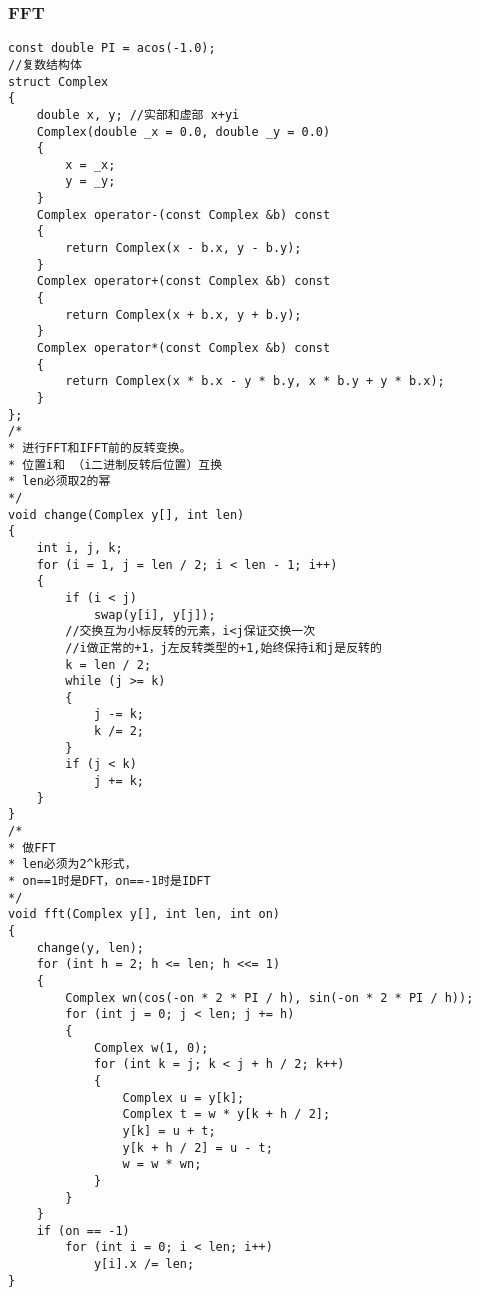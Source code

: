 \documentclass[a4]{article}
\begin{document}
\subsubsection{FFT}
\begin{lstlisting}
const double PI = acos(-1.0);
//复数结构体
struct Complex
{
    double x, y; //实部和虚部 x+yi
    Complex(double _x = 0.0, double _y = 0.0)
    {
        x = _x;
        y = _y;
    }
    Complex operator-(const Complex &b) const
    {
        return Complex(x - b.x, y - b.y);
    }
    Complex operator+(const Complex &b) const
    {
        return Complex(x + b.x, y + b.y);
    }
    Complex operator*(const Complex &b) const
    {
        return Complex(x * b.x - y * b.y, x * b.y + y * b.x);
    }
};
/*
* 进行FFT和IFFT前的反转变换。
* 位置i和 （i二进制反转后位置）互换
* len必须取2的幂
*/
void change(Complex y[], int len)
{
    int i, j, k;
    for (i = 1, j = len / 2; i < len - 1; i++)
    {
        if (i < j)
            swap(y[i], y[j]);
        //交换互为小标反转的元素，i<j保证交换一次
        //i做正常的+1，j左反转类型的+1,始终保持i和j是反转的
        k = len / 2;
        while (j >= k)
        {
            j -= k;
            k /= 2;
        }
        if (j < k)
            j += k;
    }
}
/*
* 做FFT
* len必须为2^k形式，
* on==1时是DFT，on==-1时是IDFT
*/
void fft(Complex y[], int len, int on)
{
    change(y, len);
    for (int h = 2; h <= len; h <<= 1)
    {
        Complex wn(cos(-on * 2 * PI / h), sin(-on * 2 * PI / h));
        for (int j = 0; j < len; j += h)
        {
            Complex w(1, 0);
            for (int k = j; k < j + h / 2; k++)
            {
                Complex u = y[k];
                Complex t = w * y[k + h / 2];
                y[k] = u + t;
                y[k + h / 2] = u - t;
                w = w * wn;
            }
        }
    }
    if (on == -1)
        for (int i = 0; i < len; i++)
            y[i].x /= len;
}
\end{lstlisting}
\end{document}
